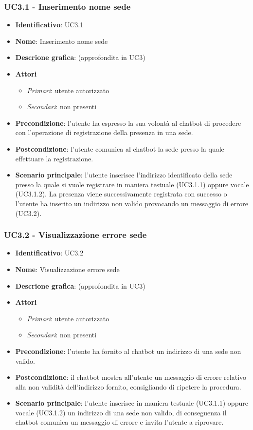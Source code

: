 \subsubsection{UC3.1 - Inserimento nome sede}
\begin{itemize}
    \item \textbf{Identificativo}: UC3.1
    \item \textbf{Nome}: Inserimento nome sede
    \item \textbf{Descrione grafica}: (approfondita in UC3)
    \item \textbf{Attori}
 \begin{itemize} 
    \item \textit{Primari}: utente autorizzato
    \item \textit{Secondari}: non presenti
 \end{itemize}
 \item \textbf{Precondizione}: l'utente ha espresso la sua volontà al chatbot di procedere con l'operazione di registrazione della presenza in una sede.
 \item \textbf{Postcondizione}: l'utente comunica al chatbot la sede presso la quale effettuare la registrazione.
 \item \textbf{Scenario principale}: l'utente inserisce l'indirizzo identificato della sede presso la quale si vuole registrare in maniera testuale (UC3.1.1) oppure vocale (UC3.1.2). La presenza viene successivamente registrata con successo o l'utente ha inserito un indirizzo non valido provocando un messaggio di errore (UC3.2). 
\end{itemize}

\subsubsection{UC3.2 - Visualizzazione errore sede}
\begin{itemize}
    \item \textbf{Identificativo}: UC3.2
    \item \textbf{Nome}: Visualizzazione errore sede
    \item \textbf{Descrione grafica}: (approfondita in UC3)
    \item \textbf{Attori}
 \begin{itemize} 
    \item \textit{Primari}: utente autorizzato
    \item \textit{Secondari}: non presenti
 \end{itemize}
 \item \textbf{Precondizione}: l'utente ha fornito al chatbot un indirizzo di una sede non valido.
 \item \textbf{Postcondizione}: il chatbot mostra all'utente un messaggio di errore relativo alla non validità dell'indirizzo fornito, consigliando di ripetere la procedura. 
 \item \textbf{Scenario principale}: l'utente inserisce in maniera testuale (UC3.1.1) oppure vocale (UC3.1.2) un indirizzo di una sede non valido, di conseguenza il chatbot comunica un messaggio di errore e invita l'utente a riprovare. 
\end{itemize}
\newpage